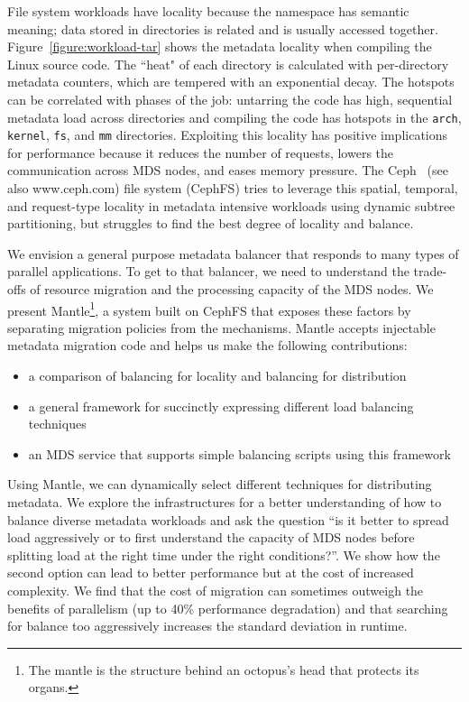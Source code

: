File system workloads have locality because the namespace has semantic meaning; data stored in directories is related and is usually accessed together. Figure~\ref{figure:workload-tar} shows the metadata locality when compiling the Linux source code. The ``heat" of each directory is calculated with per-directory metadata counters, which are tempered with an exponential decay. The hotspots can be correlated with phases of the job: untarring the code has high, sequential metadata load across directories and compiling the code has hotspots in the \texttt{arch}, \texttt{kernel}, \texttt{fs}, and \texttt{mm} directories. Exploiting this locality has positive implications for performance because it reduces the number of requests, lowers the communication across MDS nodes, and eases memory pressure. The Ceph~\cite{weil:osdi2006-ceph} (see also www.ceph.com) file system (CephFS) tries to leverage this spatial, temporal, and request-type locality in metadata intensive workloads using dynamic subtree partitioning, but struggles to find the best degree of locality and balance.

We envision a general purpose metadata balancer that responds to many types of parallel applications. To get to that balancer, we need to understand the trade-offs of resource migration and the processing capacity of the MDS nodes. We present Mantle\footnote{The mantle is the structure behind an octopus's head that protects its organs.}, a system built on CephFS that exposes these factors by separating migration policies from the mechanisms. Mantle accepts injectable metadata migration code and helps us make the following contributions:

\begin{itemize}
	\item a comparison of balancing for locality and balancing for distribution
    \item a general framework for succinctly expressing different load balancing techniques 
    \item an MDS service that supports simple balancing scripts using this framework
\end{itemize}

Using Mantle, we can dynamically select different techniques for distributing metadata. We explore the infrastructures for a better understanding of how to balance diverse metadata workloads and ask the question ``is it better to spread load aggressively or to first understand the capacity of MDS nodes before splitting load at the right time under the right conditions?''. We show how the second option can lead to better performance but at the cost of increased complexity. We find that the cost of migration can sometimes outweigh the benefits of parallelism (up to 40\% performance degradation) and that searching for balance too aggressively increases the standard deviation in runtime.

